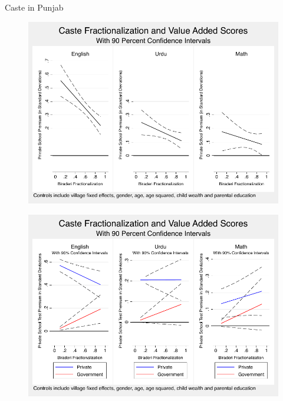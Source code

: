 \documentclass{beamer}
\begin{document}
\begin{frame}{Caste in Punjab}
\end{frame}

\begin{frame}{}
	\begin{figure}[h]
		\centering	
		\includegraphics[scale=0.8]{graphs/kids_combined.pdf}
	\end{figure}
\end{frame}

\begin{frame}{}
	\begin{figure}[htb]
		\begin{center}
		\includegraphics[scale=0.8]{graphs/kids_combined_district.pdf}
		\end{center}
	\end{figure}
	
\end{frame}
\end{document}
